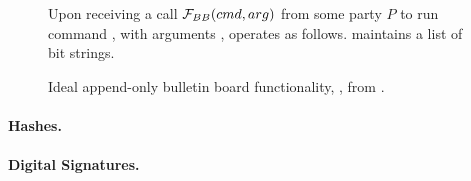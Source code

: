 \begin{figure}
  \begin{framed}
    \begin{minipage}[t]{\textwidth}
      \textrm{Upon receiving a call $\mathcal{F}_{BB}(cmd,arg)$ from
        some party $P$ to run command \cmd, with arguments \arg,
        \IdealFaobb operates as follows.}
      \textrm{\IdealFaobb maintains a list \aobbl of bit strings.}      
    \end{minipage}
    \vspace*{0.5em}

    \begin{minipage}[t]{0.55\textwidth}
    \end{minipage}
    \hspace*{1.25em}
    \begin{minipage}[t]{0.45\textwidth}
    \end{minipage}
  \end{framed}
  \caption{Ideal append-only bulletin board functionality, \IdealFaobb, from
    \cite{acc+20}.}
  \label{fig:faobb}
\end{figure}

\paragraph{Hashes.} %

\paragraph{Digital Signatures.} %

